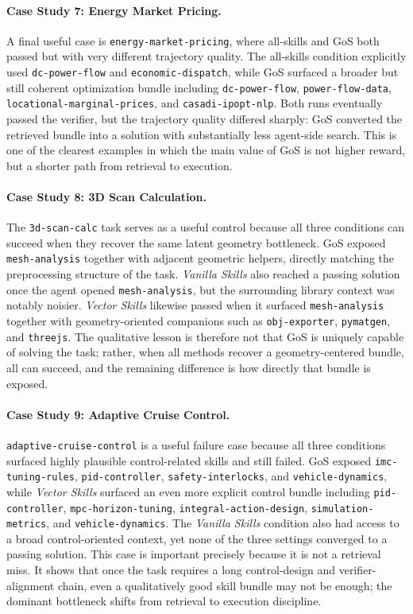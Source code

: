 \paragraph{Case Study 7: Energy Market Pricing.} A final useful case is \texttt{energy-market-pricing}, where all-skills and GoS both passed but with very different trajectory quality. The all-skills condition explicitly used \texttt{dc-power-flow} and \texttt{economic-dispatch}, while GoS surfaced a broader but still coherent optimization bundle including \texttt{dc-power-flow}, \texttt{power-flow-data}, \texttt{locational-marginal-prices}, and \texttt{casadi-ipopt-nlp}. Both runs eventually passed the verifier, but the trajectory quality differed sharply: GoS converted the retrieved bundle into a solution with substantially less agent-side search. This is one of the clearest examples in which the main value of GoS is not higher reward, but a shorter path from retrieval to execution.

\paragraph{Case Study 8: 3D Scan Calculation.} The \texttt{3d-scan-calc} task serves as a useful control because all three conditions can succeed when they recover the same latent geometry bottleneck. GoS exposed \texttt{mesh-analysis} together with adjacent geometric helpers, directly matching the preprocessing structure of the task. \textit{Vanilla Skills} also reached a passing solution once the agent opened \texttt{mesh-analysis}, but the surrounding library context was notably noisier. \textit{Vector Skills} likewise passed when it surfaced \texttt{mesh-analysis} together with geometry-oriented companions such as \texttt{obj-exporter}, \texttt{pymatgen}, and \texttt{threejs}. The qualitative lesson is therefore not that GoS is uniquely capable of solving the task; rather, when all methods recover a geometry-centered bundle, all can succeed, and the remaining difference is how directly that bundle is exposed.

\paragraph{Case Study 9: Adaptive Cruise Control.} \texttt{adaptive-cruise-control} is a useful failure case because all three conditions surfaced highly plausible control-related skills and still failed. GoS exposed \texttt{imc-tuning-rules}, \texttt{pid-controller}, \texttt{safety-interlocks}, and \texttt{vehicle-dynamics}, while \textit{Vector Skills} surfaced an even more explicit control bundle including \texttt{pid-controller}, \texttt{mpc-horizon-tuning}, \texttt{integral-action-design}, \texttt{simulation-metrics}, and \texttt{vehicle-dynamics}. The \textit{Vanilla Skills} condition also had access to a broad control-oriented context, yet none of the three settings converged to a passing solution. This case is important precisely because it is not a retrieval miss. It shows that once the task requires a long control-design and verifier-alignment chain, even a qualitatively good skill bundle may not be enough; the dominant bottleneck shifts from retrieval to execution discipline.

